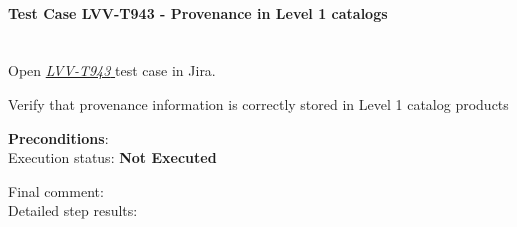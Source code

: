\documentclass[DM,lsstdraft,STR,toc]{lsstdoc}
\begin{document}
    \paragraph{Test Case LVV-T943 - Provenance in Level 1 catalogs
 }\mbox{}\\

Open  \href{https://jira.lsstcorp.org/secure/Tests.jspa#/testCase/LVV-T943}{\textit{ LVV-T943 } }
test case in Jira.

    Verify that provenance information is correctly stored in Level 1
catalog products


    \textbf{ Preconditions}:\\
    

    Execution status: {\bf Not Executed }

    Final comment:\\


    Detailed step results:
\end{document}
